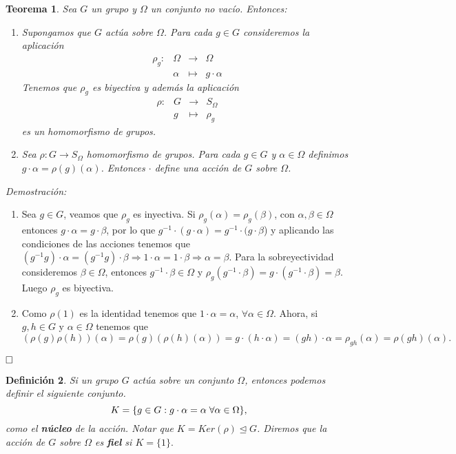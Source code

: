 \documentclass[12pt]{article}
\newtheorem{theorem}{Teorema}[section]
\newtheorem{definition}[theorem]{Definición}
\begin{document}
\begin{theorem} \label{eq:princAcci}
Sea $G$ un grupo y $\Omega$ un conjunto no vacío. Entonces: 
\begin{enumerate}
\item Supongamos que $G$ actúa sobre $\Omega$. Para cada $g \in G$ consideremos la aplicación $$\begin{array}{rccl}
\rho_g \colon &\Omega&\longrightarrow &\Omega \\
&\alpha& \longmapsto &g \cdot \alpha
\end{array}
$$
Tenemos que $\rho_g$ es biyectiva y además la aplicación 
$$\begin{array}{rccl}
\rho \colon &G&\longrightarrow &S_{\Omega} \\
&g& \longmapsto &\rho_g
\end{array}
$$ es un homomorfismo de grupos.
\item Sea $\rho \colon G \longrightarrow S_{\Omega}$ homomorfismo de grupos. Para cada $g \in G$ y $\alpha \in \Omega$ definimos $g \cdot \alpha = \rho(g)(\alpha)$. Entonces $\cdot$ define una acción de $G$ sobre $\Omega$.
\end{enumerate}
\end{theorem}
\emph{Demostración: }
\begin{enumerate}
\item Sea $g \in G$, veamos que $\rho_g$ es inyectiva. Si $\rho_g(\alpha)=\rho_g(\beta)$, con $\alpha, \beta \in \Omega$ entonces $g \cdot \alpha = g \cdot \beta$, por lo que $g^{-1} \cdot (g\cdot \alpha) = g^{-1}  \cdot (g \cdot \beta$) y aplicando las condiciones de las acciones tenemos que $ (g^{-1}g) \cdot \alpha = (g^{-1}g) \cdot \beta \Rightarrow 1 \cdot \alpha = 1 \cdot \beta \Rightarrow \alpha = \beta$. Para la sobreyectividad consideremos $\beta \in \Omega$, entonces $ g^{-1} \cdot \beta \in \Omega$ y $\rho_g(g^{-1}\cdot \beta)= g \cdot (g^{-1} \cdot \beta )= \beta$. Luego $\rho_g$ es biyectiva.
\item Como $\rho (1)$ es la identidad tenemos que $1 \cdot \alpha = \alpha$, $\forall \alpha \in \Omega$. Ahora, si $g,h \in G$ y $\alpha \in \Omega$ tenemos que $$(\rho(g)\rho(h))(\alpha) = \rho(g)(\rho(h)(\alpha)) = g \cdot(h \cdot \alpha ) = (gh) \cdot \alpha = \rho_{gh}(\alpha) = \rho(gh)(\alpha).$$
\end{enumerate}

$\hfill \square$

\begin{definition}Si un grupo $G$ actúa sobre un conjunto $\Omega$, entonces podemos definir el siguiente conjunto. $$K = \lbrace g \in G : g\cdot \alpha = \alpha \hspace{0.1cm} \forall \alpha \in \Omega \rbrace,$$ como el \textbf{núcleo} de la acción. Notar que $K = Ker(\rho) \unlhd G$. Diremos que la acción de $G$ sobre $\Omega$ es \textbf{fiel} si $K = \lbrace 1 \rbrace.$
\end{definition}
\end{document}
